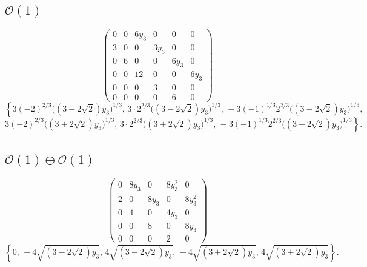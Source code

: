 \documentclass[11pt]{amsart}
\begin{document}
\subsection{$\mathcal{O}(1)$}
\[
\begin{pmatrix}
0 & 0 & 6y_{3} & 0 & 0 & 0 \\
3 & 0 & 0 & 3y_{3} & 0 & 0 \\
0 & 6 & 0 & 0 & 6y_{3} & 0 \\
0 & 0 & 12 & 0 & 0 & 6y_{3} \\
0 & 0 & 0 & 3 & 0 & 0 \\
0 & 0 & 0 & 0 & 6 & 0
\end{pmatrix}
\]
\[
\left\{
3(-2)^{2/3}\big((3-2\sqrt{2})y_{3}\big)^{1/3},\,
3\cdot 2^{2/3}\big((3-2\sqrt{2})y_{3}\big)^{1/3},\,
-3(-1)^{1/3}2^{2/3}\big((3-2\sqrt{2})y_{3}\big)^{1/3},\right.
\]
\[
\left.
3(-2)^{2/3}\big((3+2\sqrt{2})y_{3}\big)^{1/3},\,
3\cdot 2^{2/3}\big((3+2\sqrt{2})y_{3}\big)^{1/3},\,
-3(-1)^{1/3}2^{2/3}\big((3+2\sqrt{2})y_{3}\big)^{1/3}
\right\}.
\]

\subsection{$\mathcal{O}(1)\oplus \mathcal{O}(1)$}
\[
\begin{pmatrix}
0 & 8y_{3} & 0 & 8y_{3}^{2} & 0 \\
2 & 0 & 8y_{3} & 0 & 8y_{3}^{2} \\
0 & 4 & 0 & 4y_{3} & 0 \\
0 & 0 & 8 & 0 & 8y_{3} \\
0 & 0 & 0 & 2 & 0
\end{pmatrix}
\]
\[
\left\{
0,\,
-4\sqrt{(3-2\sqrt{2})y_{3}},\,
4\sqrt{(3-2\sqrt{2})y_{3}},\,
-4\sqrt{(3+2\sqrt{2})y_{3}},\,
4\sqrt{(3+2\sqrt{2})y_{3}}
\right\}.
\]
\end{document}
